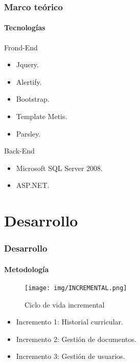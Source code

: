 \documentclass{beamer}
\begin{document}
\begin{frame}
\frametitle{Marco teórico}
\framesubtitle{Tecnologías}
\pause
\begin{block}{Frond-End}
\begin{itemize}
	\item Jquery.
	\item Alertify.
	\item Bootstrap.
	\item 	Template Metis.
	\item Parsley.
\end{itemize}
\end{block}
\pause
\begin{block}{Back-End}
\begin{itemize}
	\item Microsoft SQL Server 2008.
	\item ASP.NET.
\end{itemize}
\end{block}
\end{frame}



\section{Desarrollo}
\begin{frame}
\frametitle{Desarrollo}
\framesubtitle{Metodología}

    \begin{figure}
        \texttt{[image: img/INCREMENTAL.png]}
        \caption{Ciclo de vida incremental}
    \end{figure} 
   	\begin{itemize}[<+->]
   	
		\item Incremento 1: Historial curricular.
		\item Incremento 2: Gestión de documentos.
		\item Incremento 3: Gestión de usuarios.
	\end{itemize} 
\end{frame}
\end{document}
